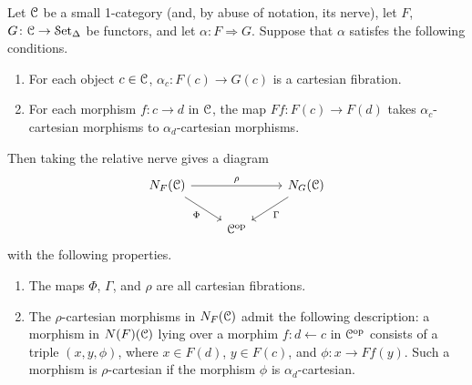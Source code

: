 \documentclass[main.tex]{subfiles}
\begin{document}
\begin{lemma}
  \label{lemma:triangle_of_cartesian_fibrations}
  Let $\mathcal{C}$ be a small 1-category (and, by abuse of notation, its nerve), let $F$, $G\colon \mathcal{C} \to \mathcal{S}\mathrm{et}_{\Delta}$ be functors, and let $\alpha\colon F \Rightarrow G$. Suppose that $\alpha$ satisfes the following conditions.
  \begin{enumerate}
    \item For each object $c \in \mathcal{C}$, $\alpha_{c}\colon F(c) \to G(c)$ is a cartesian fibration.

    \item For each morphism $f\colon c \to d$ in $\mathcal{C}$, the map $Ff\colon F(c) \to F(d)$ takes $\alpha_{c}$-cartesian morphisms to $\alpha_{d}$-cartesian morphisms.
  \end{enumerate}
  Then taking the relative nerve gives a diagram
  \begin{equation*}
    \begin{tikzcd}
      N_{F}(\category{C})
      \arrow[rr, "\rho"]
      \arrow[dr, swap, "\Phi"]
      &&
      N_{G}(\category{C})
      \arrow[dl, "\Gamma"]
      \\
      & \category{C}\op
    \end{tikzcd}
  \end{equation*}
  with the following properties.
  \begin{enumerate}
    \item The maps $\Phi$, $\Gamma$, and $\rho$ are all cartesian fibrations.

    \item The $\rho$-cartesian morphisms in $N_{F}(\mathcal{C})$ admit the following description: a morphism in $N(F)(\mathcal{C})$ lying over a morphim $f\colon d \leftarrow c$ in $\mathcal{C}^{\mathrm{op}}$ consists of a triple $(x, y, \phi)$, where $x \in F(d)$, $y \in F(c)$, and $\phi\colon x \to Ff(y)$. Such a morphism is $\rho$-cartesian if the morphism $\phi$ is $\alpha_{d}$-cartesian.
  \end{enumerate}
\end{lemma}
\end{document}
